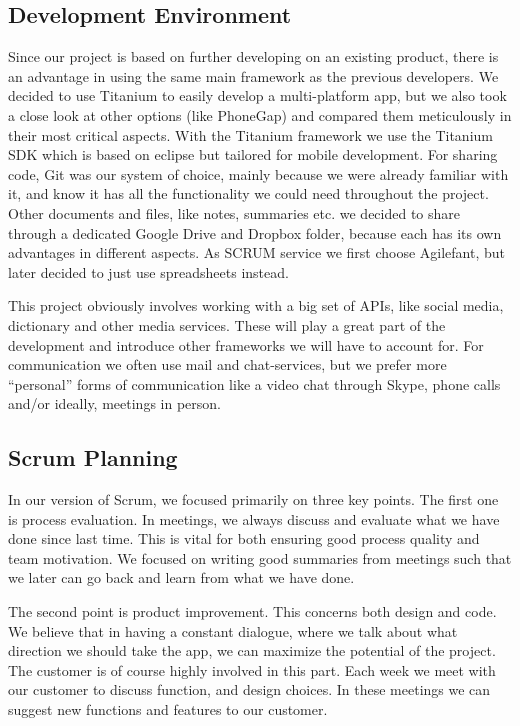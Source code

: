 \subsection{Development Environment}

Since our project is based on further developing on an existing product, there is an advantage in using the same main framework as the previous developers. We decided to use Titanium to easily develop a multi-platform app, but we also took a close look at other options (like PhoneGap) and compared them meticulously in their most critical aspects. With the Titanium framework we use the Titanium SDK which is based on eclipse but tailored for mobile development. For sharing code, Git was our system of choice, mainly because we were already familiar with it, and know it has all the functionality we could need throughout the project. Other documents and files, like notes, summaries etc. we decided to share through a dedicated Google Drive and Dropbox folder, because each has its own advantages in different aspects. As SCRUM service we first choose Agilefant, but later decided to just use spreadsheets instead.

This project obviously involves working with a big set of APIs, like social media, dictionary and other media services. These will play a great part of the development and introduce other frameworks we will have to account for. For communication we often use mail and chat-services, but we prefer more “personal” forms of communication like a video chat through Skype, phone calls and/or ideally, meetings in person.

\subsection{Scrum Planning}
\label{sec:scrumPlanning}
In our version of Scrum, we focused primarily on three key points. The first one is process evaluation. In meetings, we always discuss and evaluate what we have done since last time. This is vital for both ensuring good process quality and team motivation. We focused on writing good summaries from meetings such that we later can go back and learn from what we have done.

The second point is product improvement. This concerns both design and code. We believe that in having a constant dialogue, where we talk about what direction we should take the app, we can maximize the potential of the project. The customer is of course highly involved in this part. Each week we meet with our customer to discuss function, and design choices. In these meetings we can suggest new functions and features to our customer.

